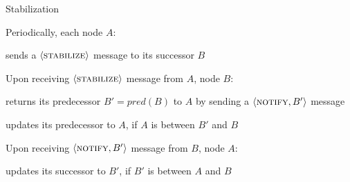 \begin{frame}{Stabilization}

\BIL
\item Periodically, each node $A$:
\BI
\item sends a $\langle \textsc{stabilize} \rangle$ message to its successor $B$
\EI
\item Upon receiving $\langle \textsc{stabilize} \rangle$ message from $A$, node $B$:
\BI
\item returns its predecessor $B'=\mathit{pred}(B)$ to $A$ by sending a $\langle \textsc{notify}, B' \rangle$ message
\item updates its predecessor to $A$, if $A$ is between $B'$ and $B$
\EI
\item Upon receiving $\langle \textsc{notify}, B' \rangle$ message from $B$, node $A$:
\BI
\item updates its successor to $B'$, if $B'$ is between $A$ and $B$
\EI
\EIL

\end{frame}

